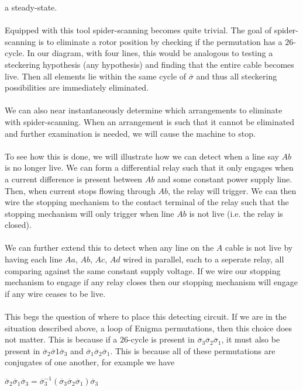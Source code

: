     a steady-state.
    \\\\Equipped with this tool spider-scanning becomes quite trivial. The goal of spider-scanning is to eliminate a rotor position by checking if the permutation has a $26$-cycle. In our diagram, with four lines, 
    this would be analogous to testing a steckering hypothesis (any hypothesis) and finding that the entire cable becomes live. Then all elements lie within the same cycle of $\overline\sigma$ and thus all steckering possibilities are immediately eliminated. 
    \\\\We can also near instantaneously determine which arrangements to eliminate with spider-scanning. When an arrangement is such that it cannot be eliminated and further examination is needed, we will cause the machine to stop. 
    \\\\To see how this is done, we will illustrate how we can detect when a line say $Ab$ is no longer live. We can form a differential relay such that it only engages when a current difference is present between $Ab$ and some constant power supply line. Then, when current stops
    flowing through $Ab$, the relay will trigger. We can then wire the stopping mechanism to the contact terminal of the relay such that the stopping mechanism will only trigger when line $Ab$ is not live (i.e. the relay is closed). 
    \\\\We can further extend this to detect when any line on the $A$ cable is not live by having each line $Aa$, $Ab$, $Ac$, $Ad$ wired in parallel, each to a seperate relay, all comparing against the same constant supply voltage. If we wire our stopping mechanism to engage if any relay closes 
    then our stopping mechanism will engage if any wire ceases to be live.
    \\\\This begs the question of where to place this detecting circuit. If we are in the situation described above, a loop of Enigma permutations, then this choice does not matter. This is because if a $26$-cycle is present in $\overline\sigma_3\overline\sigma_2\overline\sigma_1$, it must also be present in 
    $\overline\sigma_2\overline\sigma1\overline\sigma_3$ and $\overline\sigma_1\overline\sigma_2\overline\sigma_1$. This is because all of these permutations are conjugates of one another, for example we have 
    \begin{center}
        $\overline\sigma_2\overline\sigma_1\overline\sigma_3 = \overline\sigma_3^{-1}(\overline\sigma_3\overline\sigma_2\overline\sigma_1)\overline\sigma_3$
    \end{center}
